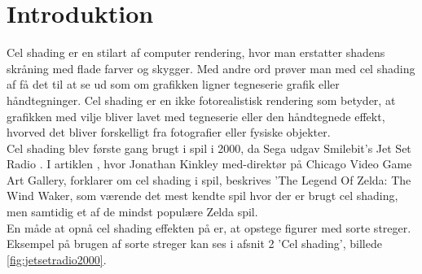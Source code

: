 \newpage
\section{Introduktion}
\setcounter{page}{1}
Cel shading er en stilart af computer rendering, hvor man erstatter shadens skråning med flade farver og skygger. Med andre ord prøver man med cel shading af få det til at se ud som om grafikken ligner tegneserie grafik eller håndtegninger. Cel shading er en ikke fotorealistisk rendering som betyder, at grafikken med vilje bliver lavet med tegneserie eller den håndtegnede effekt, hvorved det bliver forskelligt fra fotografier eller fysiske objekter. \\Cel shading blev første gang brugt i spil i 2000, da Sega udgav  Smilebit's Jet Set Radio \cite{tvtropes}. I artiklen \cite{kinkley}, hvor Jonathan Kinkley med-direktør på Chicago Video Game Art Gallery, forklarer om cel shading i spil, beskrives ’The Legend Of Zelda: The Wind Waker, som værende det mest kendte spil hvor der er brugt cel shading, men samtidig et af de mindst populære Zelda spil.\\

En måde at opnå cel shading effekten på er, at opstege figurer med sorte streger. Eksempel på brugen af sorte streger kan ses i afsnit 2 'Cel shading', billede \ref{fig:jetsetradio2000}.